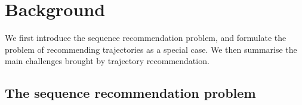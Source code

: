 

\section{Background}


We first introduce the sequence recommendation problem,
and formulate the problem of recommending trajectories as a special case.
We then summarise the main challenges brought by trajectory recommendation.


\subsection{The sequence recommendation problem}

